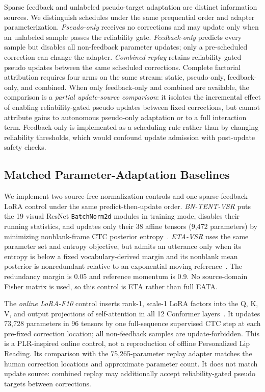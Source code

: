 Sparse feedback and unlabeled pseudo-target adaptation are distinct information sources. We distinguish schedules under the same prequential order and adapter parameterization. \emph{Pseudo-only} receives no corrections and may update only when an unlabeled sample passes the reliability gate. \emph{Feedback-only} predicts every sample but disables all non-feedback parameter updates; only a pre-scheduled correction can change the adapter. \emph{Combined replay} retains reliability-gated pseudo updates between the same scheduled corrections. Complete factorial attribution requires four arms on the same stream: static, pseudo-only, feedback-only, and combined. When only feedback-only and combined are available, the comparison is a \emph{partial update-source comparison}: it isolates the incremental effect of enabling reliability-gated pseudo updates between fixed corrections, but cannot attribute gains to autonomous pseudo-only adaptation or to a full interaction term. Feedback-only is implemented as a scheduling rule rather than by changing reliability thresholds, which would confound update admission with post-update safety checks.

\subsection{Matched Parameter-Adaptation Baselines}

We implement two source-free normalization controls and one sparse-feedback LoRA control under the same predict-then-update order. \emph{BN-TENT-VSR} puts the 19 visual ResNet \texttt{BatchNorm2d} modules in training mode, disables their running statistics, and updates only their 38 affine tensors (9,472 parameters) by minimizing nonblank-frame CTC posterior entropy~\cite{wang2021tent}. \emph{ETA-VSR} uses the same parameter set and entropy objective, but admits an utterance only when its entropy is below a fixed vocabulary-derived margin and its nonblank mean posterior is nonredundant relative to an exponential moving reference~\cite{niu2022eata}. The redundancy margin is 0.05 and reference momentum is 0.9. No source-domain Fisher matrix is used, so this control is ETA rather than full EATA.

The \emph{online LoRA-F10} control inserts rank-1, scale-1 LoRA factors into the Q, K, V, and output projections of self-attention in all 12 Conformer layers~\cite{yeo2024personalized}. It updates 73,728 parameters in 96 tensors by one full-sequence supervised CTC step at each pre-fixed correction location; all non-feedback samples are update-forbidden. This is a PLR-inspired online control, not a reproduction of offline Personalized Lip Reading. Its comparison with the 75,265-parameter replay adapter matches the human correction locations and approximate parameter count. It does not match update source: combined replay may additionally accept reliability-gated pseudo targets between corrections.

